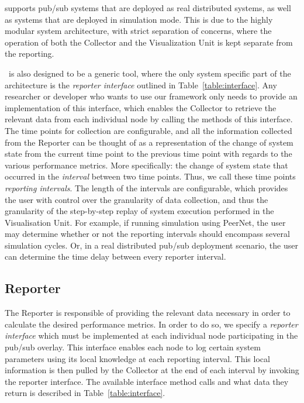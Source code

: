 \demo{} supports pub/sub systems that are deployed as
real distributed systems, as well as systems that are deployed in
simulation mode. This is due to the highly modular system architecture,
with strict separation of concerns, where the operation of both the
Collector and the Visualization Unit is kept separate from the reporting.

\demo~is also designed to be a generic tool, where the only system
specific part of the architecture is the \emph{reporter interface}
outlined in Table~\ref{table:interface}. Any researcher or developer who
wants to use our framework only needs to provide an implementation of
this interface, which enables the Collector to retrieve the relevant
data from each individual node by calling the methods of this
interface. The time points for collection are configurable, and all the
information collected from the Reporter can be thought of as a
representation of the change of system state from the current time point
to the previous time point with regards to the various performance
metrics. More specifically: the change of system state that occurred in
the \emph{interval} between two time points. Thus, we call these time
points \emph{reporting intervals}. The length of the intervals are
configurable, which provides the user with control over the granularity
of data collection, and thus the granularity of the step-by-step replay
of system execution performed in the Visualisation Unit. For example, if
running simulation using PeerNet, the user may determine whether or not
the reporting intervals should encompass several simulation cycles. Or,
in a real distributed pub/sub deployment scenario, the user can
determine the time delay between every reporter interval.


\subsection{Reporter}

The Reporter is responsible of providing the relevant data necessary in
order to calculate the desired performance metrics. In order to do so,
we specify a \emph{reporter interface} which must be implemented at each
individual node participating in the pub/sub overlay. This interface
enables each node to log certain system parameters using its local
knowledge at each reporting interval. This local information is then pulled
by the Collector at the end of each interval by invoking the
reporter interface. The available interface method calls and what data
they return is described in Table~\ref{table:interface}.

